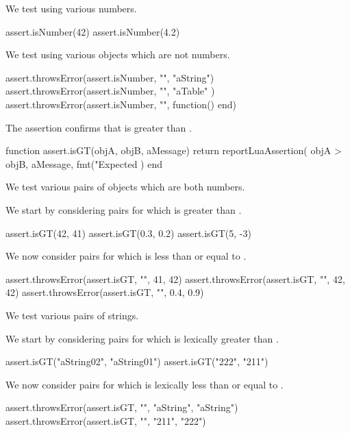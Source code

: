 
We test using various numbers.

\startLuaTest
  assert.isNumber(42)
  assert.isNumber(4.2)
\stopLuaTest
\stopTestCase


We test using various objects which are not numbers. 

\startLuaTest
  assert.throwsError(assert.isNumber, "", "aString")
  assert.throwsError(assert.isNumber, "", { "aTable" })
  assert.throwsError(assert.isNumber, "", function() end)
\stopLuaTest
\stopTestCase

\stopTestSuite


The  assertion confirms that  is greater than 
. 

\startLuaCode
function assert.isGT(objA, objB, aMessage)
  return reportLuaAssertion(
    objA > objB,
    aMessage,
    fmt("Expected %
  )
end
\stopLuaCode


We test various pairs of objects which are both numbers.

We start by considering pairs for which  is greater than 
. 

\startLuaTest
  assert.isGT(42, 41)
  assert.isGT(0.3, 0.2)
  assert.isGT(5, -3)
\stopLuaTest

We now consider pairs for which  is less than or equal to 
. 

\startLuaTest
  assert.throwsError(assert.isGT, "", 41, 42)
  assert.throwsError(assert.isGT, "", 42, 42)
  assert.throwsError(assert.isGT, "", 0.4, 0.9)
\stopLuaTest
\stopTestCase


We test various pairs of strings.

We start by considering pairs for which  is lexically greater 
than . 

\startLuaTest
  assert.isGT("aString02", "aString01")
  assert.isGT("222", "211")
\stopLuaTest

We now consider pairs for which  is lexically less than or 
equal to . 

\startLuaTest
  assert.throwsError(assert.isGT, "", "aString", "aString")
  assert.throwsError(assert.isGT, "", "211", "222")
\stopLuaTest
\stopTestCase

